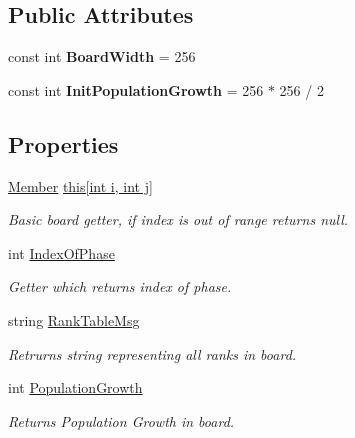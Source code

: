 \subsection*{Public Attributes}
\begin{DoxyCompactItemize}
\item 
\hypertarget{class_music_population_1_1_board_ac394649f4b46b9df6162738673548e5f}{const int {\bfseries Board\+Width} = 256}\label{class_music_population_1_1_board_ac394649f4b46b9df6162738673548e5f}

\item 
\hypertarget{class_music_population_1_1_board_a703b732a7e262d7e973ce12f4d0bb53c}{const int {\bfseries Init\+Population\+Growth} = 256 $\ast$ 256 / 2}\label{class_music_population_1_1_board_a703b732a7e262d7e973ce12f4d0bb53c}

\end{DoxyCompactItemize}
\subsection*{Properties}
\begin{DoxyCompactItemize}
\item 
\hyperlink{class_music_population_1_1_member}{Member} \hyperlink{class_music_population_1_1_board_abd14bb128680a5f37fc29f006e65e4f0}{this\mbox{[}int i, int j\mbox{]}}
\begin{DoxyCompactList}\small\item\em Basic board getter, if index is out of range returns null. \end{DoxyCompactList}\item 
int \hyperlink{class_music_population_1_1_board_abaf64b14d42081829501c6958e2199aa}{Index\+Of\+Phase}
\begin{DoxyCompactList}\small\item\em Getter which returns index of phase. \end{DoxyCompactList}\item 
string \hyperlink{class_music_population_1_1_board_af0fe9cecfaf3577bf9ea697c4e909e96}{Rank\+Table\+Msg}
\begin{DoxyCompactList}\small\item\em Retrurns string representing all ranks in board. \end{DoxyCompactList}\item 
int \hyperlink{class_music_population_1_1_board_aedfe71556d1fe32c58a134a868e827c1}{Population\+Growth}
\begin{DoxyCompactList}\small\item\em Returns Population Growth in board. \end{DoxyCompactList}\end{DoxyCompactItemize}


